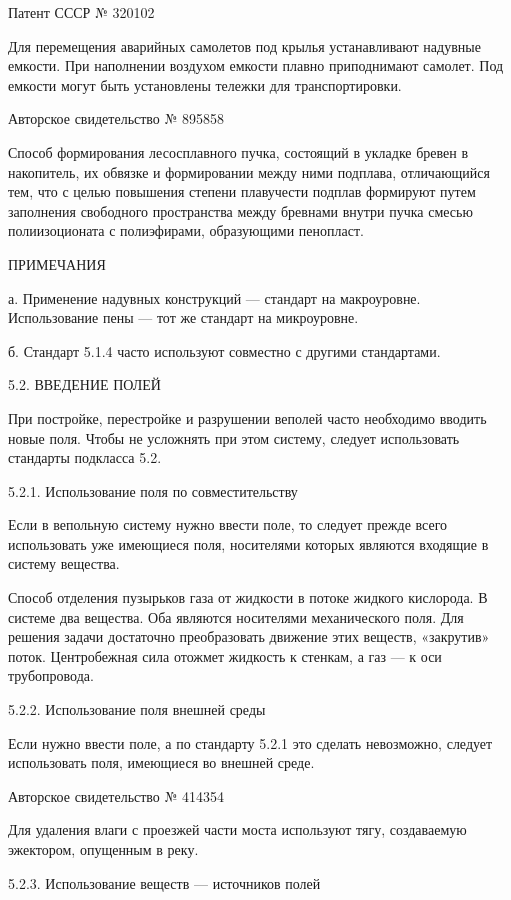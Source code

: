 Патент СССР № 320102

Для перемещения аварийных самолетов  под крылья устанавливают надувные
емкости. При наполнении воздухом  емкости плавно приподнимают самолет.
Под емкости могут быть установлены тележки для транспортировки.


Авторское свидетельство № 895858

Способ формирования  лесосплавного пучка,  состоящий в  укладке бревен
в  накопитель,   их  обвязке  и  формировании   между  ними  подплава,
отличающийся  тем, что  с целью  повышения степени  плавучести подплав
формируют  путем  заполнения  свободного пространства  между  бревнами
внутри   пучка  смесью   полиизоционата  с   полиэфирами,  образующими
пенопласт.

ПРИМЕЧАНИЯ

а.  Применение   надувных  конструкций  —  стандарт   на  макроуровне.
Использование пены — тот же стандарт на микроуровне.

б. Стандарт 5.1.4 часто используют совместно с другими стандартами.


5.2. ВВЕДЕНИЕ ПОЛЕЙ

При  постройке,  перестройке  и разрушении  веполей  часто  необходимо
вводить  новые поля.  Чтобы  не усложнять  при  этом систему,  следует
использовать стандарты подкласса 5.2.


5.2.1. Использование поля по совместительству

Если в  вепольную систему нужно  ввести поле, то следует  прежде всего
использовать уже имеющиеся поля,  носителями которых являются входящие
в систему вещества.

Способ  отделения   пузырьков  газа  от  жидкости   в  потоке  жидкого
кислорода.   В  системе   два   вещества.   Оба  являются   носителями
механического  поля.  Для   решения  задачи  достаточно  преобразовать
движение  этих веществ,  «закрутив» поток.  Центробежная сила  отожмет
жидкость к стенкам, а газ — к оси трубопровода.


5.2.2. Использование поля внешней среды

Если нужно ввести  поле, а по стандарту 5.2.1  это сделать невозможно,
следует использовать поля, имеющиеся во внешней среде.


Авторское свидетельство № 414354

Для удаления влаги с проезжей части моста используют тягу, создаваемую
эжектором, опущенным в реку.


5.2.3. Использование веществ — источников полей

